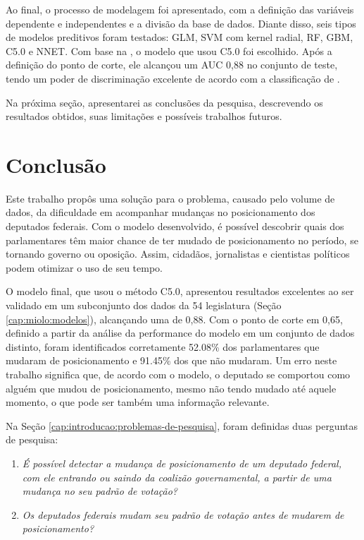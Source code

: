 \documentclass[a4paper,titlepage]{ppgi}\usepackage[]{graphicx}\usepackage[]{color}
\begin{document}
Ao final, o processo de modelagem foi apresentado, com a definição das
variáveis dependente e independentes e a divisão da base de dados. Diante
disso, seis tipos de modelos preditivos foram testados: \gls{GLM}, SVM com
kernel radial, \gls{RF}, \gls{GBM}, C5.0 e \gls{NNET}. Com base na
, o modelo que usou C5.0 foi escolhido. Após a definição do ponto
de corte, ele alcançou um \gls{AUC} 0,88 no
conjunto de teste, tendo um poder de discriminação excelente de acordo com a
classificação de .

Na próxima seção, apresentarei as conclusões da pesquisa, descrevendo os
resultados obtidos, suas limitações e possíveis trabalhos futuros.

\chapter{Conclusão}\label{cap:conclusao}

Este trabalho propôs uma solução para o problema, causado pelo volume de dados,
da dificuldade em acompanhar mudanças no posicionamento dos deputados federais.
Com o modelo desenvolvido, é possível descobrir quais dos parlamentares têm
maior chance de ter mudado de posicionamento no período, se tornando governo ou
oposição. Assim, cidadãos, jornalistas e cientistas políticos podem otimizar o
uso de seu tempo.

O modelo final, que usou o método C5.0, apresentou resultados excelentes ao ser
validado em um subconjunto dos dados da 54\textordfeminine{} legislatura (Seção
\ref{cap:miolo:modelos}), alcançando uma  de
0,88. Com o ponto de corte em
0,65, definido a partir da análise da performance do modelo em
um conjunto de dados distinto, foram identificados corretamente
52.08\% dos parlamentares
que mudaram de posicionamento e
91.45\% dos que não
mudaram. Um erro neste trabalho significa que, de acordo com o modelo, o deputado
se comportou como alguém que mudou de posicionamento, mesmo não tendo mudado
até aquele momento, o que pode ser também uma informação relevante.

Na Seção \ref{cap:introducao:problemas-de-pesquisa}, foram definidas duas
perguntas de pesquisa:

\begin{enumerate}
\item \emph{É possível detectar a mudança de posicionamento de um deputado federal,
com ele entrando ou saindo da coalizão governamental, a partir de uma mudança
no seu padrão de votação?}
\item \emph{Os deputados federais mudam seu padrão de votação antes de mudarem
de posicionamento?}
\end{enumerate}
\end{document}
